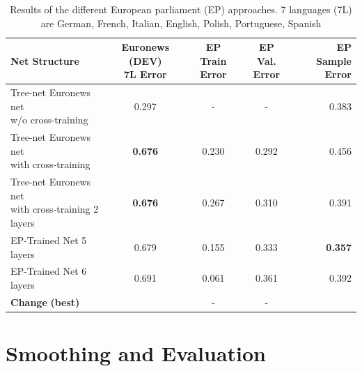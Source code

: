 \begin{table}
\label{tab:resultsEP}
\caption{Results of the different European parliament (EP) approaches. 7 languages (7L) are German, French, Italian, English, Polish, Portuguese, Spanish}
\begin{tabular}{| l | c | c | c | r | }
	\hline
	\textbf{Net Structure} & \parbox[t]{2cm}{\textbf{Euronews (DEV)} \\  \textbf{7L Error}} & \parbox[t]{1.5cm}{\textbf{EP} \\ \textbf{Train Error}} & \parbox[t]{2cm}{\textbf{EP} \\ \textbf{Val. Error}} & \parbox[t]{2.5cm}{\textbf{EP} \\ \textbf{Sample Error}}  \\
	\hline
	\parbox[t]{4.2cm}{Tree-net Euronews net \\
	 w/o cross-training} & 0.297 & - & - & 0.383 \\
	\hline
	\parbox[t]{4.2cm}{Tree-net Euronews net \\ with cross-training } & \textbf{0.676} & 0.230 & 0.292 & 0.456 \\
	\hdashline
	\parbox[t]{4.2cm}{Tree-net Euronews net \\ with cross-training 2 layers } &  \textbf{0.676} & 0.267 & 0.310 & 0.391 \\
	\hdashline
	\parbox[t]{4.2cm}{EP-Trained Net 5 layers } & 0.679 & 0.155 & 0.333 & \textbf{0.357} \\
	\hdashline
	EP-Trained Net 6 layers & 0.691 & 0.061 & 0.361 & 0.392 \\
	\hline
	\parbox[t]{5cm}{\textbf{Change} \textbf{(best)}} &  & - & - &  \\
	\hline
\end{tabular}
\end{table}

\chapter{Smoothing and Evaluation}
\label{ch:eval}

